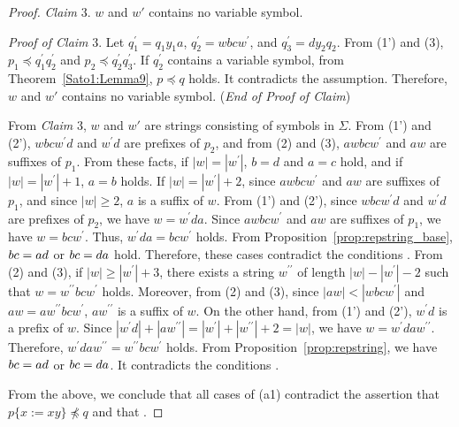 \begin{proof}
  \smallskip

  \noindent
  \textit{Claim} 3. $w$ and $w'$ contains no variable symbol.

  \smallskip
  \noindent
  \textit{Proof of Claim} 3.
  Let $q_{1}^{\prime} = q_{1}y_{1}a$, $q_{2}^{\prime} = wbcw^{\prime}$, and $q_{3}^{\prime} = dy_{2}q_{2}$. From (1') and (3), $p_{1} \preceq q^{\prime}_{1}q^{\prime}_{2}$ and $p_{2} \preceq q^{\prime}_{2}q^{\prime}_{3}$. If $q_{2}^{\prime}$ contains a variable symbol, from Theorem~\ref{Sato1:Lemma9}, $p \preceq q$ holds. It contradicts the assumption. Therefore, $w$ and $w'$ contains no variable symbol. (\textit{End of Proof of Claim})

  \smallskip

  From \textit{Claim} 3, $w$ and $w'$ are strings consisting of symbols in $\Sigma$. From (1') and (2'), $wbcw^{\prime}d$ and $w^{\prime}d$ are prefixes of $p_{2}$, and from (2) and (3), $awbcw^{\prime}$ and $aw$ are suffixes of $p_{1}$.
  From these facts, if $|w|=|w^{\prime}|$, $b = d$ and $a = c$ hold, and if $|w|=|w^{\prime}|+1$, $a = b$ holds.
  If $|w| = |w^{\prime}|+2$, since $awbcw^{\prime}$ and $aw$ are suffixes of $p_{1}$, and since $|w|\geq 2$, $a$ is a suffix of $w$.
  From (1') and (2'), since $wbcw^{\prime}d$ and $w^{\prime}d$ are prefixes of $p_{2}$, we have $w=w^{\prime}da$.
  Since $awbcw^{\prime}$ and $aw$ are suffixes of $p_{1}$, we have $w=bcw^{\prime}$.
  Thus, $w^{\prime}da = bcw^{\prime}$ holds.
  From Proposition~\ref{prop:repstring_base}, $bc = ad$ or $bc = da$ hold.
  Therefore, these cases contradict the conditions \TheConditionA.
  From (2) and (3), if $|w| \ge |w^{\prime}|+3$, there exists a string $w^{\prime\prime}$ of length $|w|-|w^{\prime}|-2$ such that $w=w^{\prime\prime}bcw^{\prime}$ holds.
  Moreover, from (2) and (3), since $|aw| < |wbcw^{\prime}|$ and $aw = aw^{\prime\prime}bcw^{\prime}$, $aw^{\prime\prime}$ is a suffix of $w$.
  On the other hand, from (1') and (2'), $w^{\prime}d$ is a prefix of $w$.
  Since $|w^{\prime}d| + |aw^{\prime\prime}| = |w^{\prime}| + |w^{\prime\prime}| + 2 = |w|$, we have $w=w^{\prime}daw^{\prime\prime}$. Therefore, $w^{\prime}daw^{\prime\prime} = w^{\prime\prime}bcw^{\prime}$ holds.
  From Proposition~\ref{prop:repstring}, we have $bc = ad$ or $bc = da$.
  It contradicts the conditions \TheConditionA.

  From the above, we conclude that all cases of (a1) contradict the assertion that $p\{x := xy\} \not\preceq q$ and that \TheConditionA.
  

\end{proof}
